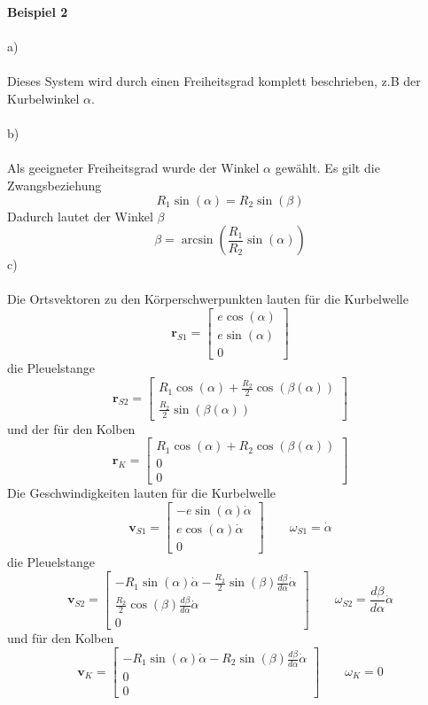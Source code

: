 \textbf{Beispiel 2}\\ \\
a)\\ \\
Dieses System wird durch einen Freiheitsgrad komplett beschrieben, z.B der Kurbelwinkel $\alpha$. \\ \\
b)\\ \\
Als geeigneter Freiheitsgrad wurde der Winkel $\alpha$ gewählt. Es gilt die Zwangsbeziehung
\[
	R_1\sin(\alpha) = R_2\sin(\beta)
\]
Dadurch lautet der Winkel $\beta$
\[
	\beta = \arcsin\left(\frac{R_1}{R_2}\sin(\alpha)\right)
\]
c)\\ \\
Die Ortsvektoren zu den Körperschwerpunkten lauten für die Kurbelwelle 
\[
	\textbf{r}_{S1} = \begin{bmatrix}
		e\cos(\alpha) \\
		e\sin(\alpha) \\ 
		0
	\end{bmatrix}
\]
die Pleuelstange
\[
	\textbf{r}_{S2} = \begin{bmatrix}
		R_1\cos(\alpha) + \frac{R_2}{2}\cos(\beta(\alpha)) \\
		\frac{R_2}{2}\sin(\beta(\alpha))
	\end{bmatrix}
\]
und der für den Kolben
\[
	\textbf{r}_K = \begin{bmatrix}
		R_1\cos(\alpha) + R_2\cos(\beta(\alpha)) \\
		0 \\
		0		
	\end{bmatrix}
\]
\newpage
\noindent
Die Geschwindigkeiten lauten für die Kurbelwelle
\[
	\textbf{v}_{S1} = \begin{bmatrix}
		-e\sin(\alpha)\dot{\alpha }\\
		e\cos(\alpha)\dot{\alpha} \\ 
		0
	\end{bmatrix}
	\qquad
	\omega_{S1} = \dot{\alpha}
\]
die Pleuelstange
\[
	\textbf{v}_{S2} = \begin{bmatrix}
		-R_1\sin(\alpha)\dot{\alpha} - \frac{R_2}{2}\sin(\beta)\frac{d\beta}{d\alpha}\dot{\alpha} \\
		\frac{R_2}{2}\cos(\beta)\frac{d\beta}{d\alpha}\dot{\alpha} \\
		0
	\end{bmatrix}
	\qquad
	\omega_{S2} = \frac{d\beta}{d\alpha}\dot{\alpha} 
\]
und für den Kolben
\[
	\textbf{v}_K = \begin{bmatrix}
		-R_1\sin(\alpha)\dot{\alpha} - R_2\sin(\beta)\frac{d\beta}{d\alpha}\dot{\alpha} \\
		0 \\
		0
	\end{bmatrix}
	\qquad
	\omega_K = 0
\]

